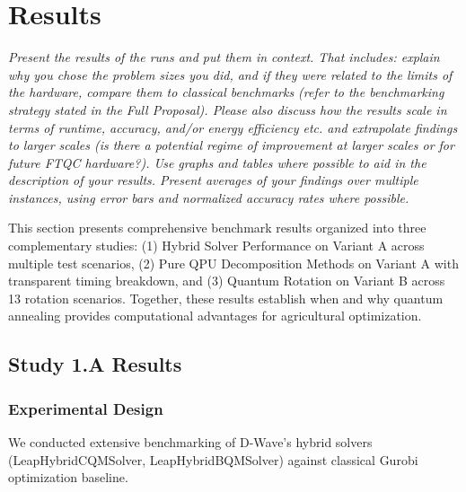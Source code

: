 \section{Results}
\label{sec:results}

\textit{
Present the results of the runs and put them in context. That includes: explain why you chose the problem sizes you did, and if they were related to the limits of the hardware, compare them to classical benchmarks (refer to the benchmarking strategy stated in the Full Proposal). Please also discuss how the results scale in terms of runtime, accuracy, and/or energy efficiency etc. and extrapolate findings to larger scales (is there a potential regime of \textit{improvement} at larger scales or for future FTQC hardware?). 
Use graphs and tables where possible to aid in the description of your results. Present averages of your findings over multiple instances, using error bars and normalized accuracy rates where possible.
}


This section presents comprehensive benchmark results organized into three complementary studies: (1) Hybrid Solver Performance on Variant A across multiple test scenarios, (2) Pure QPU Decomposition Methods on Variant A with transparent timing breakdown, and (3) Quantum Rotation on Variant B across 13 rotation scenarios. Together, these results establish when and why quantum annealing provides computational advantages for agricultural optimization.


\subsection{Study 1.A Results}
\label{subsec:hybrid_benchmarks}

\subsubsection{Experimental Design}

We conducted extensive benchmarking of D-Wave's hybrid solvers (LeapHybridCQMSolver, LeapHybridBQMSolver) against classical Gurobi optimization baseline.


